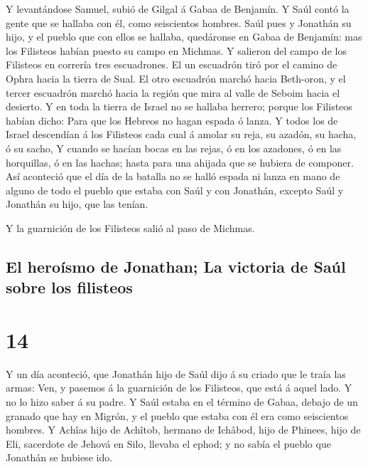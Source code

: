  Y levantándose Samuel, subió de Gilgal á Gabaa de
Benjamín. Y Saúl contó la gente que se hallaba con él, como seiscientos
hombres.  Saúl pues y Jonathán su hijo, y el pueblo que
con ellos se hallaba, quedáronse en Gabaa de Benjamín: mas los Filisteos
habían puesto su campo en Michmas.  Y salieron del campo
de los Filisteos en correría tres escuadrones. El un escuadrón tiró por
el camino de Ophra hacia la tierra de Sual.  El otro
escuadrón marchó hacia Beth-oron, y el tercer escuadrón marchó hacia la
región que mira al valle de Seboim hacia el desierto.  Y
en toda la tierra de Israel no se hallaba herrero; porque los Filisteos
habían dicho: Para que los Hebreos no hagan espada ó lanza.
 Y todos los de Israel descendían á los Filisteos cada
cual á amolar su reja, su azadón, su hacha, ó su sacho, 
Y cuando se hacían bocas en las rejas, ó en los azadones, ó en las
horquillas, ó en las hachas; hasta para una ahijada que se hubiera de
componer.  Así aconteció que el día de la batalla no se
halló espada ni lanza en mano de alguno de todo el pueblo que estaba con
Saúl y con Jonathán, excepto Saúl y Jonathán su hijo, que las tenían.

 Y la guarnición de los Filisteos salió al paso de
Michmas.

\hypertarget{el-herouxedsmo-de-jonathan-la-victoria-de-sauxfal-sobre-los-filisteos}{%
\subsection{El heroísmo de Jonathan; La victoria de Saúl sobre los
filisteos}\label{el-herouxedsmo-de-jonathan-la-victoria-de-sauxfal-sobre-los-filisteos}}

\hypertarget{section-13}{%
\section{14}\label{section-13}}

 Y un día aconteció, que Jonathán hijo de Saúl dijo á su
criado que le traía las armas: Ven, y pasemos á la guarnición de los
Filisteos, que está á aquel lado. Y no lo hizo saber á su padre.
 Y Saúl estaba en el término de Gabaa, debajo de un
granado que hay en Migrón, y el pueblo que estaba con él era como
seiscientos hombres.  Y Achîas hijo de Achîtob, hermano de
Ichâbod, hijo de Phinees, hijo de Eli, sacerdote de Jehová en Silo,
llevaba el ephod; y no sabía el pueblo que Jonathán se hubiese ido.

